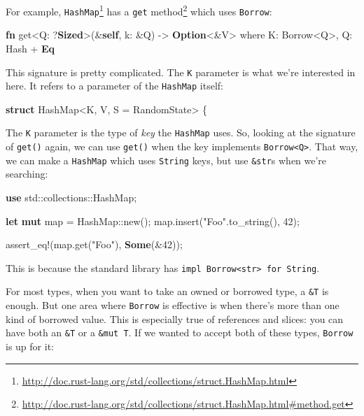 \documentclass[a4paper,]{book}
\newenvironment{Shaded}{\begin{snugshade}}{\end{snugshade}}
\newcommand{\KeywordTok}[1]{\textcolor[rgb]{0.13,0.29,0.53}{\textbf{{#1}}}}
\newcommand{\DecValTok}[1]{\textcolor[rgb]{0.00,0.00,0.81}{{#1}}}
\newcommand{\StringTok}[1]{\textcolor[rgb]{0.31,0.60,0.02}{{#1}}}
\newcommand{\OtherTok}[1]{\textcolor[rgb]{0.56,0.35,0.01}{{#1}}}
\newcommand{\NormalTok}[1]{{#1}}
\renewcommand{\href}[2]{#2\footnote{\url{#1}}}
\begin{document}
For example,
\href{http://doc.rust-lang.org/std/collections/struct.HashMap.html}{\texttt{HashMap}}
has a
\href{http://doc.rust-lang.org/std/collections/struct.HashMap.html\#method.get}{\texttt{get}
method} which uses \texttt{Borrow}:

\begin{Shaded}
\begin{Highlighting}[]
\KeywordTok{fn} \NormalTok{get<Q: ?}\KeywordTok{Sized}\NormalTok{>(&}\KeywordTok{self}\NormalTok{, k: &Q) -> }\KeywordTok{Option}\NormalTok{<&V>}
    \NormalTok{where K: Borrow<Q>,}
          \NormalTok{Q: Hash + }\KeywordTok{Eq}
\end{Highlighting}
\end{Shaded}

This signature is pretty complicated. The \texttt{K} parameter is what
we're interested in here. It refers to a parameter of the
\texttt{HashMap} itself:

\begin{Shaded}
\begin{Highlighting}[]
\KeywordTok{struct} \NormalTok{HashMap<K, V, S = RandomState> \{}
\end{Highlighting}
\end{Shaded}

The \texttt{K} parameter is the type of \emph{key} the \texttt{HashMap}
uses. So, looking at the signature of \texttt{get()} again, we can use
\texttt{get()} when the key implements
\texttt{Borrow\textless{}Q\textgreater{}}. That way, we can make a
\texttt{HashMap} which uses \texttt{String} keys, but use
\texttt{\&str}s when we're searching:

\begin{Shaded}
\begin{Highlighting}[]
\KeywordTok{use} \NormalTok{std::collections::HashMap;}

\KeywordTok{let} \KeywordTok{mut} \NormalTok{map = HashMap::new();}
\NormalTok{map.insert(}\StringTok{"Foo"}\NormalTok{.to_string(), }\DecValTok{42}\NormalTok{);}

\OtherTok{assert_eq!}\NormalTok{(map.get(}\StringTok{"Foo"}\NormalTok{), }\KeywordTok{Some}\NormalTok{(&}\DecValTok{42}\NormalTok{));}
\end{Highlighting}
\end{Shaded}

This is because the standard library has
\texttt{impl\ Borrow\textless{}str\textgreater{}\ for\ String}.

For most types, when you want to take an owned or borrowed type, a
\texttt{\&T} is enough. But one area where \texttt{Borrow} is effective
is when there's more than one kind of borrowed value. This is especially
true of references and slices: you can have both an \texttt{\&T} or a
\texttt{\&mut\ T}. If we wanted to accept both of these types,
\texttt{Borrow} is up for it:
\end{document}
